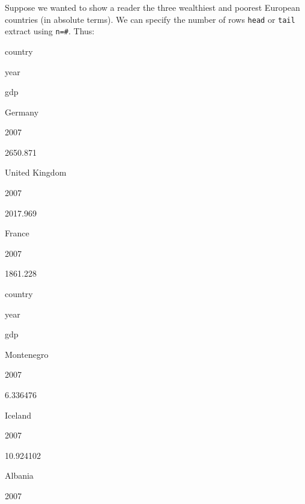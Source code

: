 \documentclass[
]{book}
\newenvironment{Shaded}{\begin{snugshade}}{\end{snugshade}}
\newcommand{\DataTypeTok}[1]{\textcolor[rgb]{0.13,0.29,0.53}{#1}}
\newcommand{\DecValTok}[1]{\textcolor[rgb]{0.00,0.00,0.81}{#1}}
\newcommand{\KeywordTok}[1]{\textcolor[rgb]{0.13,0.29,0.53}{\textbf{#1}}}
\newcommand{\NormalTok}[1]{#1}
\newcommand{\OperatorTok}[1]{\textcolor[rgb]{0.81,0.36,0.00}{\textbf{#1}}}
\newcommand{\StringTok}[1]{\textcolor[rgb]{0.31,0.60,0.02}{#1}}
\begin{document}
Suppose we wanted to show a reader the three wealthiest and poorest European countries (in absolute terms). We can specify the number of rows \texttt{head} or \texttt{tail} extract using \texttt{n=\#}. Thus:

\begin{Shaded}
\end{Shaded}

country

year

gdp

Germany

2007

2650.871

United Kingdom

2007

2017.969

France

2007

1861.228

\begin{Shaded}
\end{Shaded}

country

year

gdp

Montenegro

2007

6.336476

Iceland

2007

10.924102

Albania

2007
\end{document}
